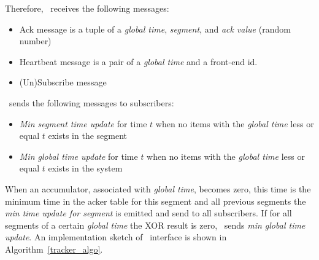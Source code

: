Therefore, \tracker\ receives the following messages:
\begin{itemize}
    \item Ack message is a tuple of a \textit{global time}, \textit{segment}, and \textit{ack value} (random number)
    \item Heartbeat message is a pair of a \textit{global time} and a front-end id.
    \item (Un)Subscribe message
\end{itemize}


\tracker\ sends the following messages to subscribers:
\begin{itemize}
    \item \textit{Min segment time update} for time $t$ when no items with the \textit{global time} less or equal $t$ exists in the segment
    \item \textit{Min global time update} for time $t$ when no items with the \textit{global time} less or equal $t$ exists in the system
\end{itemize}


When an accumulator, associated with \textit{global time}, becomes zero, this time is the minimum time in the acker table for this segment and all previous segments the \textit{min time update for segment} is emitted and send to all subscribers. If for all segments of a certain \textit{global time} the XOR result is zero, \tracker\ sends \textit{min global time update}. An implementation sketch of \tracker\ interface is shown in Algorithm~\ref{tracker_algo}.



